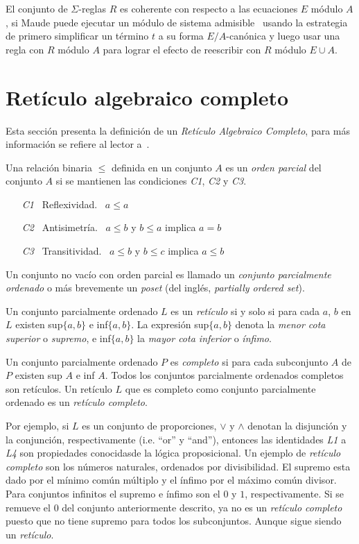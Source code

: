  El conjunto de $\Sigma$-reglas $R$ es coherente con respecto a las
 ecuaciones $E$ m\'odulo $A$, si Maude puede ejecutar un m\'odulo de sistema
 admisible~\cite{maude-book} usando la estrategia de primero simplificar
 un t\'ermino $t$ a su forma $E/A$-can\'onica y luego usar una regla con $R$
 m\'odulo $A$ para lograr el efecto de reescribir con $R$ m\'odulo $E \cup A$.

\section{Ret\'iculo algebraico completo}
\label{rac.prelim}

Esta secci\'on presenta la definici\'on de un \textit{Ret\'iculo Algebraico Completo}, 
para m\'as informaci\'on se refiere al lector a~\cite{burris1981course}. 

Una relaci\'on binaria $\leq$ definida en un conjunto $A$ es un 
\textit{orden parcial} del conjunto $A$ si se mantienen las 
condiciones \textit{C1}, \textit{C2} y \textit{C3}.

\begin{enumerate}  
	\item [\it{C1}] \ Reflexividad. \ $a \leq a$
	\item [\it{C2}] \ Antisimetr\'ia. \ $a \leq b$ y $b \leq a$ implica $a = b$
	\item [\it{C3}] \ Transitividad. \ $a \leq b$ y $b \leq c$ implica $a \leq b$
\end{enumerate}

Un conjunto no vac\'io con orden parcial es llamado un \textit{conjunto 
parcialmente ordenado} o m\'as brevemente un \textit{poset} 
(del ingl\'es, \textit{partially ordered set}).

Un conjunto parcialmente ordenado $L$ es un \textit{ret\'iculo} si y 
solo si para cada $a$, $b$ en $L$ existen sup$\{a,b\}$ e inf$\{a,b\}$. 
La expresi\'on sup$\{a,b\}$ denota la \textit{menor cota superior} o \textit{supremo}, 
e inf$\{a,b\}$ la \textit{mayor cota inferior} o \textit{\'infimo}.

Un conjunto parcialmente ordenado $P$ es \textit{completo} si para 
cada subconjunto $A$ de $P$ existen sup $A$ e inf $A$. Todos los 
conjuntos parcialmente ordenados completos son ret\'iculos. Un 
ret\'iculo $L$ que es completo como conjunto parcialmente ordenado 
es un \textit{ret\'iculo completo}.

Por ejemplo, si $L$ es un conjunto de proporciones, $\vee$ y $\wedge$ 
denotan la disjunci\'on y la conjunci\'on, respectivamente (i.e. ``or'' y ``and''), 
entonces las identidades \textit{L1} a \textit{L4} son propiedades 
conocidasde la l\'ogica proposicional. Un ejemplo de \textit{ret\'iculo completo} 
son los n\'umeros naturales, ordenados por divisibilidad. El supremo esta dado 
por el m\'inimo com\'un m\'ultiplo y el \'infimo por el m\'aximo com\'un divisor. 
Para conjuntos infinitos el supremo e \'infimo son el $0$ y $1$, respectivamente. 
Si se remueve el $0$ del conjunto anteriormente descrito, ya no 
es un \textit{ret\'iculo completo} puesto que no tiene supremo para 
todos los subconjuntos. Aunque sigue siendo un \textit{ret\'iculo}.

